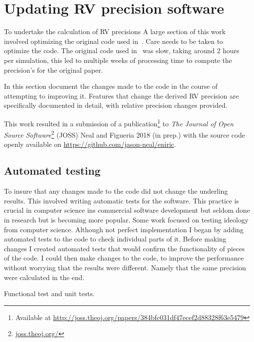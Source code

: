 {\clearpage

\section{Updating {RV} precision software}
To undertake the calculation of {RV} precisions
A large section of this work involved optimizing the original code used in~\citet{figueira_radial_2016}.
Care needs to be taken to optimize the code.
The original code used in~\citet{figueira_radial_2016} was slow, taking around 2 hours per simulation, this led to multiple weeks of processing time to compute the precision's for the original paper.

In this section  document the changes made to the code in the course of attempting to improving it.
Features that change the derived {RV} precision are specifically documented in detail, with relative precision changes provided.

This work resulted in a submission of a publication\footnote{Available at \href{http://joss.theoj.org/papers/384bfc031df47ecef2d88328f63e5479}{http://joss.theoj.org/papers/384bfc031df47ecef2d88328f63e5479}} to \emph{The Journal of Open Source Software}\footnote{\href{http://joss.theoj.org/}{joss.theoj.org/}} (JOSS) {Neal and Figueria 2018 (in prep.)} with the source code openly available on \href{Github}{https://github.com/jason-neal/eniric}.


\subsection{Automated testing}
To insure that any changes made to the code did not change the underling results.
This involved writing automatic tests for the software.
This practice is crucial in computer science ins commercial software development but seldom done in research but is becoming more popular.
Some work focused on testing ideology from computer science.
Although not perfect implementation I began by adding automated tests to the code to check individual parts of it.
Before making changes I created automated tests that would confirm the functionality of pieces of the code.
I could then make changes to the code, to improve the performance without worrying that the results were different.
Namely that the same precision were calculated in the end.

Functional test and unit tests.


}
